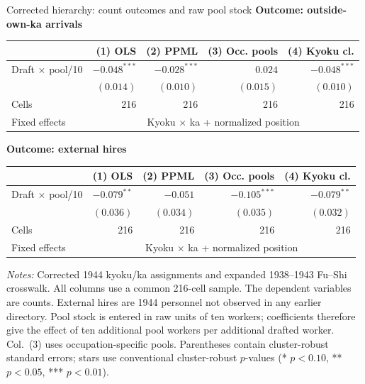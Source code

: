 \documentclass{beamer}
\begin{document}
\begin{frame}[t]{Corrected hierarchy: count outcomes and raw pool stock}
\centering\tiny\vspace{-0.5em}
\textbf{Outcome: outside-own-ka arrivals}\\[-1pt]
\begin{tabular}{lrrrr}\toprule
 & (1) OLS & (2) PPML & (3) Occ. pools & (4) Kyoku cl. \\\midrule
Draft $\times$ pool/10 & $-0.048^{***}$ & $-0.028^{***}$ & $0.024$ & $-0.048^{***}$ \\
 & $(0.014)$ & $(0.010)$ & $(0.015)$ & $(0.010)$ \\
Cells & 216 & 216 & 216 & 216 \\
Fixed effects & \multicolumn{4}{c}{Kyoku $\times$ ka + normalized position} \\\bottomrule\end{tabular}
\smallskip
\textbf{Outcome: external hires}\\[-1pt]
\begin{tabular}{lrrrr}\toprule
 & (1) OLS & (2) PPML & (3) Occ. pools & (4) Kyoku cl. \\\midrule
Draft $\times$ pool/10 & $-0.079^{**}$ & $-0.051$ & $-0.105^{***}$ & $-0.079^{**}$ \\
 & $(0.036)$ & $(0.034)$ & $(0.035)$ & $(0.032)$ \\
Cells & 216 & 216 & 216 & 216 \\
Fixed effects & \multicolumn{4}{c}{Kyoku $\times$ ka + normalized position} \\\bottomrule\end{tabular}
\vspace{0.4em}\raggedright
{\tiny \textit{Notes:} Corrected 1944 kyoku/ka assignments and expanded 1938--1943 Fu--Shi crosswalk. All columns use a common 216-cell sample. The dependent variables are counts. External hires are 1944 personnel not observed in any earlier directory. Pool stock is entered in raw units of ten workers; coefficients therefore give the effect of ten additional pool workers per additional drafted worker. Col.\ (3) uses occupation-specific pools. Parentheses contain cluster-robust standard errors; stars use conventional cluster-robust $p$-values (* $p<0.10$, ** $p<0.05$, *** $p<0.01$).}
\end{frame}
\end{document}
